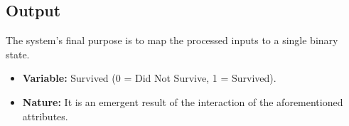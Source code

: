 \documentclass[12pt]{report}
\begin{document}
\subsection*{Output}
The system's final purpose is to map the processed inputs to a single binary state.

\begin{itemize}
    \item \textbf{Variable:} Survived (0 = Did Not Survive, 1 = Survived).
    \item \textbf{Nature:} It is an emergent result of the interaction of the aforementioned attributes.
\end{itemize}
\end{document}
